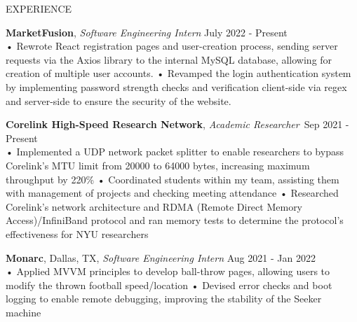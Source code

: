 \documentclass{resume} %
\begin{document}
\begin{rSection}{EXPERIENCE}

\textbf{\bf MarketFusion}, {\emph{Software Engineering Intern}} \hfill July 2022 - Present\\
• Rewrote React registration pages and user-creation process, sending server requests via the Axios library to the internal MySQL database, allowing for creation of multiple user accounts. \newline
• Revamped the login authentication system by implementing password strength checks and verification client-side via regex and server-side to ensure the security of the website. \smallskip

\textbf{\bf Corelink High-Speed Research Network}, {\emph{Academic Researcher}}\ \hfill Sep 2021 - Present \\
• Implemented a UDP network packet splitter to enable researchers to bypass Corelink's MTU limit from 20000 to 64000 bytes, increasing maximum throughput by 220\% \newline
• Coordinated students within my team, assisting them with management of projects and checking meeting attendance \newline    
• Researched Corelink’s network architecture and RDMA (Remote Direct Memory Access)/InfiniBand protocol and ran memory tests to determine the protocol's effectiveness for NYU researchers

\textbf{\bf Monarc}, Dallas, TX, {\emph{Software Engineering Intern}} \hfill Aug 2021 - Jan 2022\\
• Applied MVVM principles to develop ball-throw pages, allowing users to modify the thrown football speed/location \newline  %
• Devised error checks and boot logging to enable remote debugging, improving the stability of the Seeker machine \smallskip
\end{rSection} 
\end{document}
